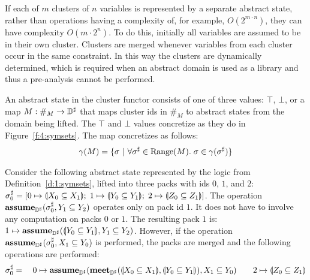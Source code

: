 If each of $m$ clusters of $n$ variables is represented by a separate abstract state, rather than operations having a complexity of, for example, $O(2^{m\cdot n})$, they can have complexity $O(m\cdot 2^n)$.  To do this, initially all variables are assumed to be in their own cluster.  Clusters are merged whenever variables from each cluster occur in the same constraint.  In this way the clusters are dynamically determined, which is required when an abstract domain is used as a library and thus a pre-analysis cannot be performed.

An abstract state in the cluster functor consists of one of three values: $\top$, $\bot$, or a map $M : \#_M \rightarrow {\mathbb{D}}^{\sharp}$ that maps cluster ids in $\#_M$ to abstract states from the domain being lifted.  The $\top$ and $\bot$ values concretize as they do in Figure~\ref{f:4:symsets}.  The map concretizes as follows:
\begin{align*}
  \gamma(M) = \{ \sigma \ | \ \forall {\sigma}^{\sharp} \in \textrm{Range}(M). \; \sigma \in \gamma({\sigma}^{\sharp}) \}
\end{align*}

\begin{example}
Consider the following abstract state represented by the logic from Definition~\ref{d:1:symsets}, lifted into three packs with ids $0$, $1$, and $2$:
$
  {\sigma}^{\sharp}_0 = [0 \mapsto \llparenthesis X_0 \subseteq X_1 \rrparenthesis; \; 1 \mapsto \llparenthesis Y_0 \subseteq Y_1 \rrparenthesis; \; 2 \mapsto \llparenthesis Z_0 \subseteq Z_1 \rrparenthesis]
$.
The operation $\textbf{assume}_{{\mathbb{D}}^{\sharp}}({\sigma}^{\sharp}_0, Y_1 \subseteq Y_2)$ operates only on pack id $1$.  It does not have to involve any computation on packs $0$ or $1$.  The resulting pack $1$ is: $1 \mapsto \textbf{assume}_{{\mathbb{D}}^{\sharp}}(\llparenthesis Y_0 \subseteq Y_1 \rrparenthesis, Y_1 \subseteq Y_2)$.  However, if the operation $\textbf{assume}_{{\mathbb{D}}^{\sharp}}({\sigma}^{\sharp}_0, X_1 \subseteq Y_0)$ is performed, the packs are merged and the following operations are performed:
\begin{align*}
{\sigma}^{\sharp}_0 = \quad 0 \mapsto \textbf{assume}_{{\mathbb{D}}^{\sharp}}(\textbf{meet}_{{\mathbb{D}}^{\sharp}}(\llparenthesis X_0 \subseteq X_1 \rrparenthesis, \llparenthesis Y_0 \subseteq Y_1 \rrparenthesis), X_1 \subseteq Y_0) \qquad 2 \mapsto \llparenthesis Z_0 \subseteq Z_1 \rrparenthesis
\end{align*}
\end{example}
